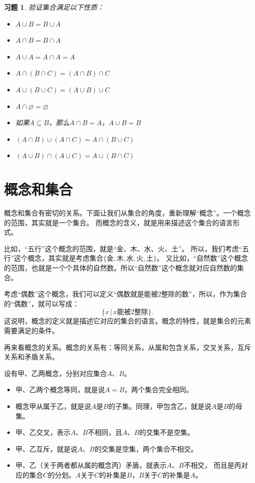\documentclass[12pt,UTF8]{ctexbook}
\newtheorem{xt}{习题}[section]
\begin{document}
\begin{xt}\label{xt:2-1-0}
    验证集合满足以下性质：
    \begin{itemize}
        \item $A \cup B = B \cup A$
        \item $A \cap B = B \cap A$
        \item $A \cup A = A \cap A = A$
        \item $A \cap (B \cap C) = (A \cap B) \cap C$
        \item $A \cup (B \cup C) = (A \cup B) \cup C$
        \item $A \cap \varnothing = \varnothing$
        \item 如果$A \subseteq B$，那么$A \cap B = A$，$A \cup B = B$
        \item $(A \cap B) \cup (A \cap C) = A \cap (B \cup C)$
        \item $(A \cup B) \cap (A \cup C) = A \cup (B \cap C)$
    \end{itemize}  
\end{xt}

\section{概念和集合}

概念和集合有密切的关系。下面让我们从集合的角度，重新理解“概念”。一个概念的范围，其实就是一个集合。
而概念的含义，就是用来描述这个集合的语言形式。

比如，“五行”这个概念的范围，就是“金、木、水、火、土”。
所以，我们考虑“五行”这个概念，其实就是考虑集合$\{\mbox{金}, \mbox{木}, \mbox{水}, \mbox{火}, \mbox{土}\}$。
又比如，“自然数”这个概念的范围，也就是一个个具体的自然数。所以“自然数”这个概念就对应自然数的集合。

考虑“偶数”这个概念，我们可以定义“偶数就是能被$2$整除的数”，所以，作为集合的“偶数”，就可以写成：
$$ \{x \,|\,x \mbox{能被}2\mbox{整除} \}.$$
这说明，概念的定义就是描述它对应的集合的语言。概念的特性，就是集合的元素需要满足的条件。

再来看概念的关系。概念的关系有：等同关系，从属和包含关系，交叉关系，互斥关系和矛盾关系。

设有甲、乙两概念，分别对应集合$A$、$B$。
\begin{itemize}
    \item 甲、乙两个概念等同，就是说$A = B$，两个集合完全相同。
    \item 概念甲从属于乙，就是说$A$是$B$的子集。同理，甲包含乙，就是说$A$是$B$的母集。
    \item 甲、乙交叉，表示$A$、$B$不相同，且$A$、$B$的交集不是空集。
    \item 甲、乙互斥，就是说$A$、$B$的交集是空集，两个集合不相交。
    \item 甲、乙（关于两者都从属的概念丙）矛盾，就表示$A$、$B$不相交，
    而且是丙对应的集合$C$的分划。$A$关于$C$的补集是$B$，$B$关于$C$的补集是$A$。
\end{itemize}
\end{document}
